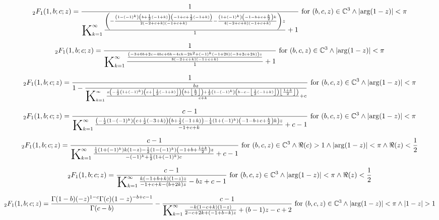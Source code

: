 \documentclass{article}
\newcommand{\bigK}{\mathop{\raisebox{-5pt}{\huge K}}}
\begin{document}
\[\, _2F_1(1,b;c;z)=\frac{1}{\bigK_{k=1}^{\infty}\frac{\left(-\frac{\left(1-(-1)^k\right) \left(b+\frac{1}{2} (-1+k)\right) \left(-1+c+\frac{1}{2} (-1+k)\right)}{2 (-2+c+k) (-1+c+k)}-\frac{\left(1+(-1)^k\right) \left(-1-b+c+\frac{k}{2}\right) k}{4 (-2+c+k) (-1+c+k)}\right) z}{1}+1}\text{ for }(b,c,z)\in \mathbb{C}^3\land \left| \arg (1-z)\right| <\pi\] 

\[\, _2F_1(1,b;c;z)=\frac{1}{\bigK_{k=1}^{\infty}\frac{\frac{\left(-3+6 b+2 c-4 b c+6 k-4 c k-2 k^2+(-1)^k (-1+2 b) (-3+2 c+2 k)\right) z}{8 (-2+c+k) (-1+c+k)}}{1}+1}\text{ for }(b,c,z)\in \mathbb{C}^3\land \left| \arg (1-z)\right| <\pi\] 

\[\, _2F_1(1,b;c;z)=\frac{1}{1-\frac{b z}{\bigK_{k=1}^{\infty}\frac{z \left(-\frac{1}{2} \left(1+(-1)^k\right) \left(c+\left\lfloor \frac{1}{2} (-1+k)\right\rfloor \right) \left(b+\left\lfloor \frac{k}{2}\right\rfloor \right)+\frac{1}{2} \left(1-(-1)^k\right) \left(b-c-\left\lfloor \frac{1}{2} (-1+k)\right\rfloor \right) \left\lfloor \frac{1+k}{2}\right\rfloor \right)}{c+k}+c}}\text{ for }(b,c,z)\in \mathbb{C}^3\land \left| \arg (1-z)\right| <\pi\] 

\[\, _2F_1(1,b;c;z)=\frac{c-1}{\bigK_{k=1}^{\infty}\frac{\left(-\frac{1}{2} \left(1-(-1)^k\right) \left(c+\frac{1}{2} (-3+k)\right) \left(b+\frac{1}{2} (-1+k)\right)-\frac{1}{4} \left(1+(-1)^k\right) \left(-1-b+c+\frac{k}{2}\right) k\right) z}{-1+c+k}+c-1}\text{ for }(b,c,z)\in \mathbb{C}^3\land \left| \arg (1-z)\right| <\pi\] 

\[\, _2F_1(1,b;c;z)=\frac{c-1}{\bigK_{k=1}^{\infty}\frac{\frac{1}{4} \left(1+(-1)^k\right) k (1-z)-\frac{1}{2} \left(1-(-1)^k\right) \left(-1+b+\frac{1+k}{2}\right) z}{-(-1)^k+\frac{1}{2} \left(1+(-1)^k\right) c}+c-1}\text{ for }(b,c,z)\in \mathbb{C}^3\land \Re(c)>1\land \left| \arg (1-z)\right| <\pi \land \Re(z)<\frac{1}{2}\] 

\[\, _2F_1(1,b;c;z)=\frac{c-1}{\bigK_{k=1}^{\infty}\frac{k (-1+b+k) (1-z) z}{-1+c+k-(b+2 k) z}-b z+c-1}\text{ for }(b,c,z)\in \mathbb{C}^3\land \left| \arg (1-z)\right| <\pi \land \Re(z)<\frac{1}{2}\] 

\[\, _2F_1(1,b;c;z)=\frac{\Gamma (1-b) (-z)^{1-c} \Gamma (c) (1-z)^{-b+c-1}}{\Gamma (c-b)}-\frac{c-1}{\bigK_{k=1}^{\infty}\frac{-k (1-c+k) (1-z)}{2-c+2 k+(-1+b-k) z}+(b-1) z-c+2}\text{ for }(b,c,z)\in \mathbb{C}^3\land \left| \arg (1-z)\right| <\pi \land \left| 1-z\right| >1\] 
\end{document}
